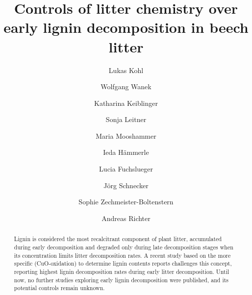 \documentclass[authoryear,preprint,review,12pt]{elsarticle}
\begin{document}
\begin{frontmatter}



\title{Controls of litter chemistry over early lignin decomposition in beech litter}


\author[1]{Lukas Kohl}
\author[1]{Wolfgang Wanek}
\author[2]{Katharina Keiblinger}
\author[1]{Sonja Leitner}
\author[1]{Maria Mooshammer}
\author[1]{Ieda H\"ammerle}
\author[1]{Lucia Fuchslueger}
\author[1]{J\"org Schnecker}
\author[2]{Sophie Zechmeister-Boltenstern}
\author[1]{Andreas Richter}

\address[1]{Department of Chemical Ecology and Ecosystem Research, University of Vienna, Althanstra\ss e 14, A-1090 Vienna, Austria}
\address[2]{Federal Research and Training Centre for Forests, Natural Hazards and Landscape, Department of Soil Biology, Seckendorff-Gudent-Weg 8, A-1131 Vienna, Austria}

\begin{abstract}
Lignin is considered the most recalcitrant component of plant litter, accumulated during early decomposition and degraded only during late decomposition stages when its concentration limits litter decomposition rates. A recent study based on the more specific (CuO-oxidation) to determine lignin contents reports challenges this concept, reporting highest lignin decomposition rates during early litter decomposition. Until now, no further studies exploring early lignin decomposition were published, and its potential controls remain unknown.


\end{abstract}
\end{frontmatter}
\end{document}
